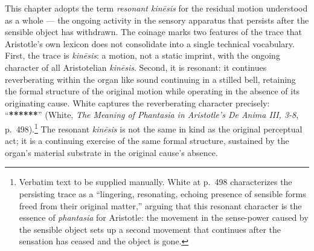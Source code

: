 This chapter adopts the term \textit{resonant kinēsis} for the residual motion understood as a whole --- the ongoing activity in the sensory apparatus that persists after the sensible object has withdrawn. The coinage marks two features of the trace that Aristotle's own lexicon does not consolidate into a single technical vocabulary. First, the trace is \textit{kinēsis}: a motion, not a static imprint, with the ongoing character of all Aristotelian \textit{kinēsis}. Second, it is resonant: it continues reverberating within the organ like sound continuing in a stilled bell, retaining the formal structure of the original motion while operating in the absence of its originating cause. White captures the reverberating character precisely: ``\textbf{******}'' (White, \textit{The Meaning of Phantasia in Aristotle's De Anima III, 3-8}, p.~498).\footnote{Verbatim text to be supplied manually. White at p.~498 characterizes the persisting trace as a ``lingering, resonating, echoing presence of sensible forms freed from their original matter,'' arguing that this resonant character is the essence of \textit{phantasia} for Aristotle: the movement in the sense-power caused by the sensible object sets up a second movement that continues after the sensation has ceased and the object is gone.} The resonant \textit{kinēsis} is not the same in kind as the original perceptual act; it is a continuing exercise of the same formal structure, sustained by the organ's material substrate in the original cause's absence.

